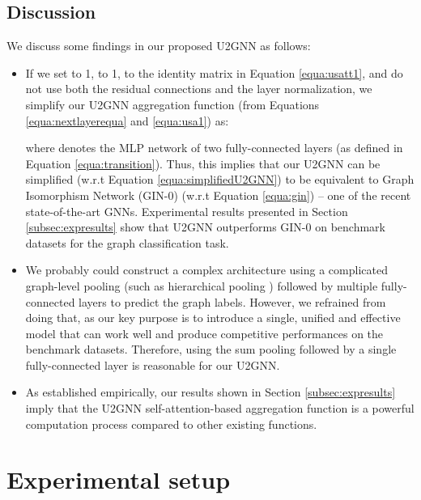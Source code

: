 \documentclass[twoside,leqno,twocolumn]{article}
\newcommand{\citep}{\cite}
\begin{document}
\subsection{Discussion} 
\label{subsec:discussion}



We discuss some findings in our proposed U2GNN as follows:

\begin{itemize}


\item If we set  to 1,  to 1,  to the identity matrix in Equation \ref{equa:usatt1}, and do not use both the residual connections and the layer normalization, we simplify our U2GNN aggregation function (from Equations \ref{equa:nextlayerequa} and \ref{equa:usa1}) as:

where  denotes the MLP network of two fully-connected layers (as defined in Equation \ref{equa:transition}). Thus, this implies that our U2GNN can be simplified (w.r.t Equation \ref{equa:simplifiedU2GNN}) to be equivalent to Graph Isomorphism Network (GIN-0) \citep{xu2019powerful} (w.r.t Equation \ref{equa:gin}) -- one of the recent state-of-the-art GNNs.
Experimental results presented in Section \ref{subsec:expresults} show that U2GNN outperforms GIN-0 on benchmark datasets for the graph classification task.


\item We probably could construct a complex architecture using a complicated graph-level pooling (such as hierarchical pooling \citep{cangea2018towards}) followed by multiple fully-connected layers \citep{Chen2019ArePG,maron2019invariant} to predict the graph labels.
However, we refrained from doing that, as our key purpose is to introduce a single, unified and effective model that can work well and produce competitive performances on the benchmark datasets. 
Therefore, using the sum pooling followed by a single fully-connected layer is reasonable for our U2GNN.

\item As established empirically, our results shown in Section \ref{subsec:expresults} imply that the U2GNN self-attention-based aggregation function is a powerful computation process compared to other existing functions.

\end{itemize}





\section{Experimental setup}
\end{document}

